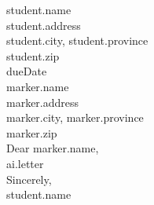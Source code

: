 \documentclass[12pt]{letter}
\begin{document}
{{student.name}} \\
{{student.address}} \\
{{student.city}}, {{student.province}} \\
{{student.zip}} \\
\newline
{{dueDate}} \\
\newline
{{marker.name}} \\
{{marker.address}} \\
{{marker.city}}, {{marker.province}} \\
{{marker.zip}} \\
\newline
Dear {{marker.name}}, \\
\newline
{{ai.letter}} \\
\newline
Sincerely, \\
\newline
{{student.name}}










\end{document}
